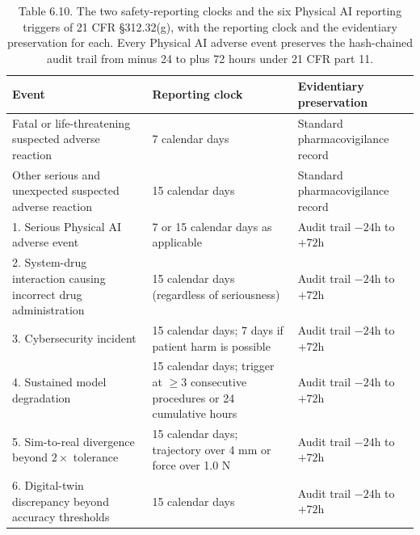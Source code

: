 \begin{table}[t]
\caption{Table 6.10. The two safety-reporting clocks and the six Physical AI
reporting triggers of 21 CFR \S 312.32(g), with the reporting clock and the
evidentiary preservation for each. Every Physical AI adverse event preserves the
hash-chained audit trail from minus 24 to plus 72 hours under 21 CFR part 11.}
\label{tab:sec06-triggers}
\centering
\begin{tabularx}{\textwidth}{L{4.8cm} L{3.2cm} Y}
\toprule
\textbf{Event} & \textbf{Reporting clock} & \textbf{Evidentiary preservation} \\
\midrule
Fatal or life-threatening suspected adverse reaction & 7 calendar days & Standard pharmacovigilance record \\
Other serious and unexpected suspected adverse reaction & 15 calendar days & Standard pharmacovigilance record \\
1. Serious Physical AI adverse event & 7 or 15 calendar days as applicable & Audit trail $-24$h to $+72$h \\
2. System-drug interaction causing incorrect drug administration & 15 calendar days (regardless of seriousness) & Audit trail $-24$h to $+72$h \\
3. Cybersecurity incident & 15 calendar days; 7 days if patient harm is possible & Audit trail $-24$h to $+72$h \\
4. Sustained model degradation & 15 calendar days; trigger at $\geq 3$ consecutive procedures or 24 cumulative hours & Audit trail $-24$h to $+72$h \\
5. Sim-to-real divergence beyond $2\times$ tolerance & 15 calendar days; trajectory over 4 mm or force over 1.0 N & Audit trail $-24$h to $+72$h \\
6. Digital-twin discrepancy beyond accuracy thresholds & 15 calendar days & Audit trail $-24$h to $+72$h \\
\bottomrule
\end{tabularx}
\end{table}


